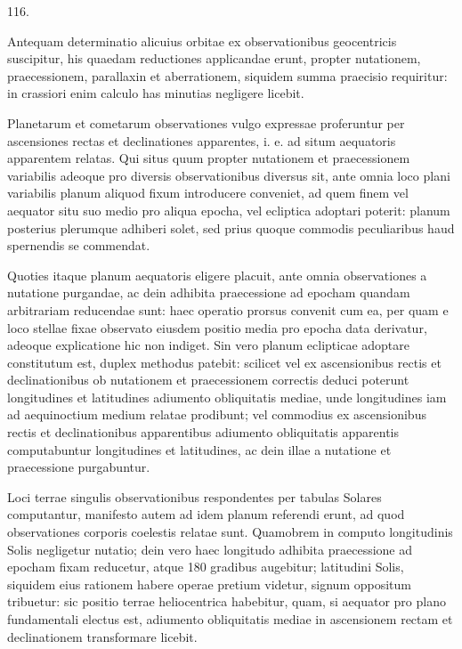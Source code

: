 \par\medskip
\begin{center}\hypertarget{native-163-article116}{}116.\end{center}
Antequam determinatio alicuius orbitae ex observationibus geocentricis suscipitur, his quaedam reductiones applicandae erunt, propter nutationem, praecessionem, parallaxin et aberrationem, siquidem summa praecisio requiritur: in crassiori enim calculo has minutias negligere licebit.

Planetarum et cometarum observationes vulgo expressae proferuntur per ascensiones rectas et declinationes apparentes, i. e. ad situm aequatoris apparentem relatas. Qui situs quum propter nutationem et praecessionem variabilis adeoque pro diversis observationibus diversus sit, ante omnia loco plani variabilis planum aliquod fixum introducere conveniet, ad quem finem vel aequator situ suo medio pro aliqua epocha, vel ecliptica adoptari poterit: planum posterius plerumque adhiberi solet, sed prius quoque commodis peculiaribus haud spernendis se commendat.

Quoties itaque planum aequatoris eligere placuit, ante omnia observationes a nutatione purgandae, ac dein adhibita praecessione ad epocham quandam arbitrariam reducendae sunt: haec operatio prorsus convenit cum ea, per quam e loco stellae fixae observato eiusdem positio media pro epocha data derivatur, adeoque explicatione hic non indiget. Sin vero planum eclipticae adoptare constitutum est, duplex methodus patebit: scilicet vel ex ascensionibus rectis et declinationibus ob nutationem et praecessionem correctis deduci poterunt longitudines et latitudines adiumento obliquitatis mediae, unde longitudines iam ad aequinoctium medium relatae prodibunt; vel commodius ex ascensionibus rectis et declinationibus apparentibus adiumento obliquitatis apparentis computabuntur longitudines et latitudines, ac dein illae a nutatione et praecessione purgabuntur.

Loci terrae singulis observationibus respondentes per tabulas Solares computantur, manifesto autem ad idem planum referendi erunt, ad quod observationes corporis coelestis relatae sunt. Quamobrem in computo longitudinis Solis negligetur nutatio; dein vero haec longitudo adhibita praecessione ad epocham fixam reducetur, atque 180 gradibus augebitur; latitudini Solis, siquidem eius rationem habere operae pretium videtur, signum oppositum tribuetur: sic positio terrae heliocentrica habebitur, quam, si aequator pro plano fundamentali electus est, adiumento obliquitatis mediae in ascensionem rectam et declinationem transformare licebit.
